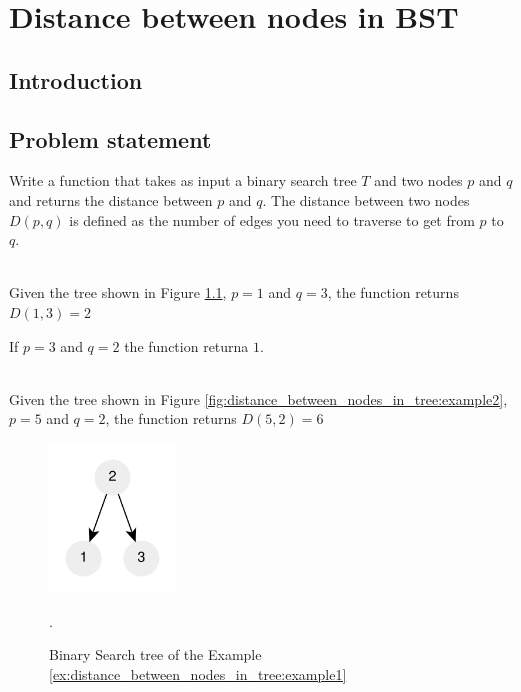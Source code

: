 %

\chapter{Distance between nodes in BST}
\label{ch:distance_between_nodes_in_tree}
\section*{Introduction}

\section{Problem statement}
\begin{exercise}
	Write a function that takes as input a binary search tree $T$ and two nodes $p$ and $q$ and returns the distance between $p$ and $q$.
	The distance between two nodes $D(p,q)$ is defined as the number of edges you need to traverse to get from $p$ to $q$.
	
	\begin{example}
		\hfill \\
		Given the tree shown in Figure \ref{fig:distance_between_nodes_in_tree:example1}, 
		$p = 1$ and $q=3$, the function returns $D(1,3)=2$ 
		
		If $p=3$ and $q=2$ the function returna $1$.
	\label{ex:distance_between_nodes_in_tree:example1}
	\end{example}

	\begin{example}
		\hfill \\
		Given the tree shown in Figure \ref{fig:distance_between_nodes_in_tree:example2}, 
		$p = 5$ and $q=2$, the function returns $D(5,2)=6$ 
		\label{ex:distance_between_nodes_in_tree:example2}
	\end{example}
\end{exercise}

\begin{figure}
	\centering
	\includegraphics[width=0.3\textwidth]{sources/distance_between_nodes_in_tree/images/example1}
	\caption{Binary Search tree of the Example
	\ref{ex:distance_between_nodes_in_tree:example1}}.
	\label{fig:distance_between_nodes_in_tree:example1}
\end{figure}


